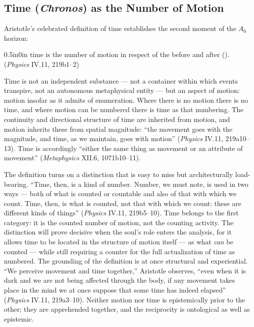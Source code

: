 \subsection{Time (\textit{Chronos}) as the Number of Motion}

Aristotle's celebrated definition of time establishes the second moment of the $A_0$ horizon:
\begin{adjustwidth}{0.5in}{0in}
time is the number of motion in respect of the before and after (). (\textit{Physics} IV.11, 219b1--2)
\end{adjustwidth}
Time is not an independent substance --- not a container within which events transpire, not an autonomous metaphysical entity --- but an aspect of motion: motion insofar as it admits of enumeration. Where there is no motion there is no time, and where motion can be numbered there is time as that numbering. The continuity and directional structure of time are inherited from motion, and motion inherits these from spatial magnitude: ``the movement goes with the magnitude, and time, as we maintain, goes with motion'' (\textit{Physics} IV.11, 219a10--13). Time is accordingly ``either the same thing as movement or an attribute of movement'' (\textit{Metaphysics} XII.6, 1071b10--11).

The definition turns on a distinction that is easy to miss but architecturally load-bearing. ``Time, then, is a kind of number. Number, we must note, is used in two ways --- both of what is counted or countable and also of that with which we count. Time, then, is what is counted, not that with which we count: these are different kinds of things'' (\textit{Physics} IV.11, 219b5--10). Time belongs to the first category: it is the counted number of motion, not the counting activity. The distinction will prove decisive when the soul's role enters the analysis, for it allows time to be located in the structure of motion itself --- as what \textit{can} be counted --- while still requiring a counter for the full actualization of time as numbered. The grounding of the definition is at once structural and experiential. ``We perceive movement and time together,'' Aristotle observes, ``even when it is dark and we are not being affected through the body, if any movement takes place in the mind we at once suppose that some time has indeed elapsed'' (\textit{Physics} IV.11, 219a3--10). Neither motion nor time is epistemically prior to the other; they are apprehended together, and the reciprocity is ontological as well as epistemic.

